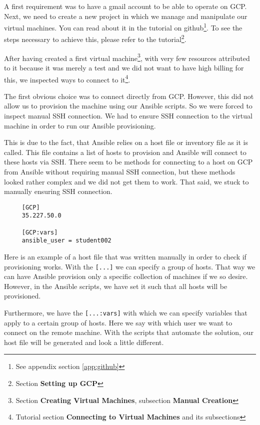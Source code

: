 
A first requirement was to have a gmail account to be able to operate
on GCP. Next, we need to create a new project in which we manage and
manipulate our virtual machines.  You can read about it in the
tutorial on github\footnote{See appendix section \ref{app:github}}.
To see the steps necessary to achieve this, please refer to the
tutorial\footnote{Section \textbf{Setting up GCP}}.

After having created a first virtual machine\footnote{Section
\textbf{Creating Virtual Machines}, subsection \textbf{Manual
Creation}}, with very few resources attributed to it because it was
merely a test and we did not want to have high billing for this, we
inspected ways to connect to it\footnote{Tutorial section
\textbf{Connecting to Virtual Machines} and its subsections}.

The first obvious choice was to connect directly from GCP. However,
this did not allow us to provision the machine using our Ansible
scripts. So we were forced to inspect manual SSH connection. We had to
ensure SSH connection to the virtual machine in order to run our
Ansible provisioning. 

This is due to the fact, that Ansible relies on a host file or
inventory file as it is called. This file contains a list of hosts to
provision and Ansible will connect to these hosts via SSH. There seem
to be methods for connecting to a host on GCP from Ansible without
requiring manual SSH connection, but these methods looked rather
complex and we did not get them to work. That said, we stuck to
manually ensuring SSH connection.

\begin{verbatim}
	 [GCP]
	 35.227.50.0

	 [GCP:vars]
	 ansible_user = student002
\end{verbatim}

Here is an example of a host file that was written manually in order
to check if provisioning works. With the \verb|[...]| we can specify a
group of hosts. That way we can have Ansible provision only a specific
collection of machines if we so desire. However, in the Ansible
scripts, we have set it such that all hosts will be provisioned.

Furthermore, we have the \verb|[...:vars]| with which we can specify
variables that apply to a certain group of hosts. Here we say with
which user we want to connect on the remote machine. With the scripts
that automate the solution, our host file will be generated and look a
little different.

